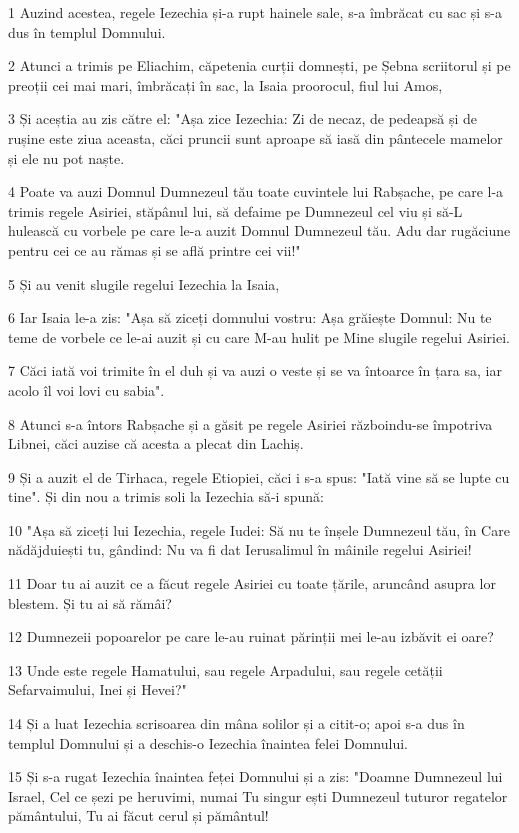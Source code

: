 \par 1 Auzind acestea, regele Iezechia și-a rupt hainele sale, s-a îmbrăcat cu sac și s-a dus în templul Domnului.
\par 2 Atunci a trimis pe Eliachim, căpetenia curții domnești, pe Șebna scriitorul și pe preoții cei mai mari, îmbrăcați în sac, la Isaia proorocul, fiul lui Amos,
\par 3 Și aceștia au zis către el: "Așa zice Iezechia: Zi de necaz, de pedeapsă și de rușine este ziua aceasta, căci pruncii sunt aproape să iasă din pântecele mamelor și ele nu pot naște.
\par 4 Poate va auzi Domnul Dumnezeul tău toate cuvintele lui Rabșache, pe care l-a trimis regele Asiriei, stăpânul lui, să defaime pe Dumnezeul cel viu și să-L hulească cu vorbele pe care le-a auzit Domnul Dumnezeul tău. Adu dar rugăciune pentru cei ce au rămas și se află printre cei vii!"
\par 5 Și au venit slugile regelui Iezechia la Isaia,
\par 6 Iar Isaia le-a zis: "Așa să ziceți domnului vostru: Așa grăiește Domnul: Nu te teme de vorbele ce le-ai auzit și cu care M-au hulit pe Mine slugile regelui Asiriei.
\par 7 Căci iată voi trimite în el duh și va auzi o veste și se va întoarce în țara sa, iar acolo îl voi lovi cu sabia".
\par 8 Atunci s-a întors Rabșache și a găsit pe regele Asiriei războindu-se împotriva Libnei, căci auzise că acesta a plecat din Lachiș.
\par 9 Și a auzit el de Tirhaca, regele Etiopiei, căci i s-a spus: "Iată vine să se lupte cu tine". Și din nou a trimis soli la Iezechia să-i spună:
\par 10 "Așa să ziceți lui Iezechia, regele Iudei: Să nu te înșele Dumnezeul tău, în Care nădăjduiești tu, gândind: Nu va fi dat Ierusalimul în mâinile regelui Asiriei!
\par 11 Doar tu ai auzit ce a făcut regele Asiriei cu toate țările, aruncând asupra lor blestem. Și tu ai să rămâi?
\par 12 Dumnezeii popoarelor pe care le-au ruinat părinții mei le-au izbăvit ei oare?
\par 13 Unde este regele Hamatului, sau regele Arpadului, sau regele cetății Sefarvaimului, Inei și Hevei?"
\par 14 Și a luat Iezechia scrisoarea din mâna solilor și a citit-o; apoi s-a dus în templul Domnului și a deschis-o Iezechia înaintea felei Domnului.
\par 15 Și s-a rugat Iezechia înaintea feței Domnului și a zis: "Doamne Dumnezeul lui Israel, Cel ce șezi pe heruvimi, numai Tu singur ești Dumnezeul tuturor regatelor pământului, Tu ai făcut cerul și pământul!
